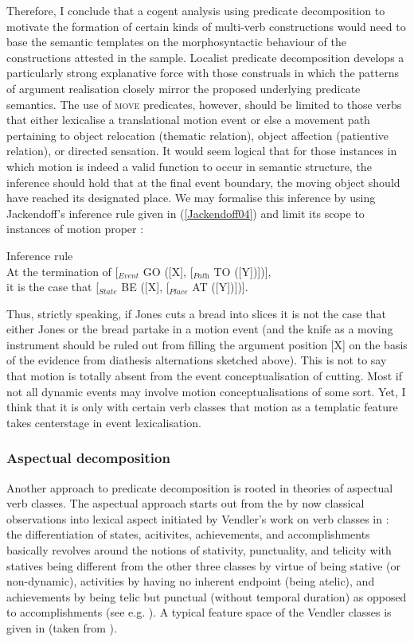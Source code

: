 Therefore, I conclude that a cogent analysis using predicate decomposition to motivate the formation of certain kinds of multi-verb constructions would need to base the semantic templates on the morphosyntactic behaviour of the constructions attested in the sample. Localist predicate decomposition develops a particularly strong explanative force with those construals in which the patterns of argument realisation closely mirror the proposed underlying predicate semantics. The use of \textsc{move} predicates, however, should be limited to those verbs that either lexicalise a translational motion event or else a movement path pertaining to object relocation (thematic relation), object affection (patientive relation), or directed sensation.
It would seem logical that for those instances in which motion is indeed a valid function to occur in semantic structure, the inference should hold that at the final event boundary, the moving object should have reached its designated place. We may formalise this inference by using Jackendoff's inference rule given in (\ref{Jackendoff04}) and limit its scope to instances of motion proper \citep[27]{Jackendoff1990}:

\ea \label{Jackendoff04} Inference rule \\
At the termination of [$_{\textit{Event}}$ GO ([X], [$_{\textit{Path}}$ TO ([Y])])], \\
it is the case that [$_{\textit{State}}$ BE ([X], [$_{\textit{Place}}$ AT ([Y])])].
\z

Thus, strictly speaking, if Jones cuts a bread into slices it is not the case that either Jones or the bread partake in a motion event (and the knife as a moving instrument should be ruled out from filling the argument position [X] on the basis of the evidence from diathesis alternations sketched above). This is not to say that motion is totally absent from the event conceptualisation of cutting. Most if not all dynamic events may involve motion conceptualisations of some sort. Yet, I think that it is only with certain verb classes that motion as a templatic feature takes centerstage in event lexicalisation.

\subsubsection{Aspectual decomposition}

Another approach to predicate decomposition is rooted in theories of aspectual verb classes. The aspectual approach starts out from the by now classical observations into lexical aspect initiated by Vendler's work on verb classes in : the differentiation of states, acitivites, achievements, and accomplishments basically revolves around the notions of stativity, punctuality, and telicity with statives being different from the other three classes by virtue of being stative (or non-dynamic), activities by having no inherent endpoint (being atelic), and achievements by being telic but punctual (without temporal duration) as opposed to accomplishments (see e.g. \citealt{levin2005argument, croft2012verbs}). A typical feature space of the Vendler classes is given in  (taken from \citealt[93]{van1997syntax}).

